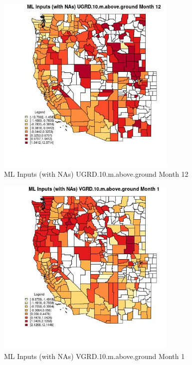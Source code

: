\begin{figure} 
\centering  
\includegraphics[width=0.77\textwidth]{Code_Outputs/Report_ML_input_PM25_Step4_part_f_de_duplicated_aves_prioritize_24hr_obswNAs_CountyUGRD10mabovegroundmedianMonth12.jpg} 
\caption{\label{fig:Report_ML_input_PM25_Step4_part_f_de_duplicated_aves_prioritize_24hr_obswNAsCountyUGRD10mabovegroundmedianMonth12}ML Inputs (with NAs) UGRD.10.m.above.ground Month 12} 
\end{figure} 
 

\clearpage 

\begin{figure} 
\centering  
\includegraphics[width=0.77\textwidth]{Code_Outputs/Report_ML_input_PM25_Step4_part_f_de_duplicated_aves_prioritize_24hr_obswNAs_CountyVGRD10mabovegroundmedianMonth1.jpg} 
\caption{\label{fig:Report_ML_input_PM25_Step4_part_f_de_duplicated_aves_prioritize_24hr_obswNAsCountyVGRD10mabovegroundmedianMonth1}ML Inputs (with NAs) VGRD.10.m.above.ground Month 1} 
\end{figure} 
 

